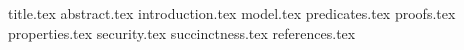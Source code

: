 \documentclass[11pt]{llncs}
\begin{document}
{title.tex}
\thispagestyle{plain}
{abstract.tex}
{introduction.tex}
{model.tex}
{predicates.tex}
{proofs.tex}
{properties.tex}
{security.tex}
{succinctness.tex}
{references.tex}
\end{document}

